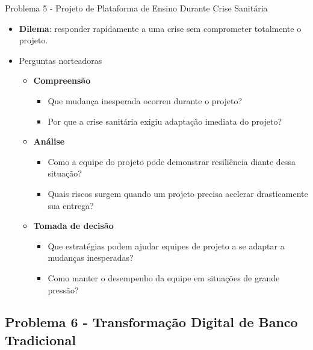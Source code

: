 \documentclass{beamer}
\begin{document}
\begin{frame}{Problema 5 - Projeto de Plataforma de Ensino Durante Crise Sanitária}
	\begin{itemize}
		\item \textbf{Dilema}: responder rapidamente a uma crise sem comprometer totalmente o projeto.
		\item Perguntas norteadoras
			\begin{itemize}
				\item \textbf{Compreensão}
				\begin{itemize}
					\justifying
					\item Que mudança inesperada ocorreu durante o projeto?
					\item Por que a crise sanitária exigiu adaptação imediata do projeto?
				\end{itemize}
				\item \textbf{Análise}
				\begin{itemize}
					\justifying
					\item Como a equipe do projeto pode demonstrar resiliência diante dessa situação?
					\item Quais riscos surgem quando um projeto precisa acelerar drasticamente sua entrega?
				\end{itemize}
				\item \textbf{Tomada de decisão}
				\begin{itemize}
					\justifying
					\item Que estratégias podem ajudar equipes de projeto a se adaptar a mudanças inesperadas?
					\item Como manter o desempenho da equipe em situações de grande pressão?
				\end{itemize}
			\end{itemize}
	\end{itemize}
\end{frame}

\subsection{Problema 6 - Transformação Digital de Banco Tradicional}
\end{document}
